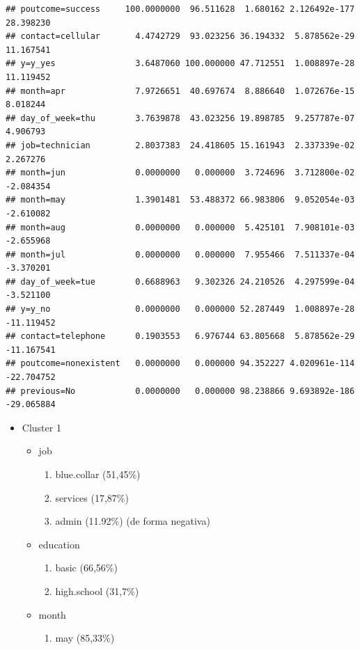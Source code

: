 \documentclass[
]{article}
\providecommand{\tightlist}{%
  \setlength{\itemsep}{0pt}\setlength{\parskip}{0pt}}
\begin{document}
\begin{verbatim}
## poutcome=success     100.0000000  96.511628  1.680162 2.126492e-177  28.398230
## contact=cellular       4.4742729  93.023256 36.194332  5.878562e-29  11.167541
## y=y_yes                3.6487060 100.000000 47.712551  1.008897e-28  11.119452
## month=apr              7.9726651  40.697674  8.886640  1.072676e-15   8.018244
## day_of_week=thu        3.7639878  43.023256 19.898785  9.257787e-07   4.906793
## job=technician         2.8037383  24.418605 15.161943  2.337339e-02   2.267276
## month=jun              0.0000000   0.000000  3.724696  3.712800e-02  -2.084354
## month=may              1.3901481  53.488372 66.983806  9.052054e-03  -2.610082
## month=aug              0.0000000   0.000000  5.425101  7.908101e-03  -2.655968
## month=jul              0.0000000   0.000000  7.955466  7.511337e-04  -3.370201
## day_of_week=tue        0.6688963   9.302326 24.210526  4.297599e-04  -3.521100
## y=y_no                 0.0000000   0.000000 52.287449  1.008897e-28 -11.119452
## contact=telephone      0.1903553   6.976744 63.805668  5.878562e-29 -11.167541
## poutcome=nonexistent   0.0000000   0.000000 94.352227 4.020961e-114 -22.704752
## previous=No            0.0000000   0.000000 98.238866 9.693892e-186 -29.065884
\end{verbatim}

\begin{itemize}
\item
  Cluster 1

  \begin{itemize}
  \item
    job

    \begin{enumerate}
    \def\labelenumi{\arabic{enumi}.}
    \item
      blue.collar (51,45\%)
    \item
      services (17,87\%)
    \item
      admin (11.92\%) (de forma negativa)
    \end{enumerate}
  \item
    education

    \begin{enumerate}
    \def\labelenumi{\arabic{enumi}.}
    \item
      basic (66,56\%)
    \item
      high.school (31,7\%)
    \end{enumerate}
  \item
    month

    \begin{enumerate}
    \def\labelenumi{\arabic{enumi}.}
    \tightlist
    \item
      may (85,33\%)
    \end{enumerate}
  \end{itemize}
\end{itemize}
\end{document}

